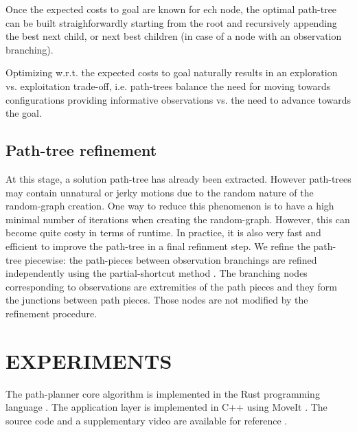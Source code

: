 \documentclass[letterpaper, 10 pt, conference]{ieeeconf}  %
\begin{document}
Once the expected costs to goal are known for ech node, the optimal path-tree can be built straighforwardly starting from the root and recursively appending the best next child, or next best children (in case of a node with an observation branching).

Optimizing w.r.t. the expected costs to goal naturally results in an exploration vs. exploitation trade-off, i.e. path-trees balance the need for moving towards configurations  providing informative observations vs. the need to advance towards the goal.

\subsection{Path-tree refinement}
At this stage, a solution path-tree has already been extracted. However path-trees may contain  unnatural or jerky motions due to the random nature of the random-graph creation. One way to reduce this phenomenon is to have a high minimal number of iterations when creating the random-graph. However, this can become quite costy in terms of runtime. In practice, it is also very fast and efficient to improve the path-tree in a final refinment step. We refine the path-tree piecewise: the path-pieces between observation branchings are refined independently using the partial-shortcut method \cite{geraerts2007creating}. The branching nodes corresponding to observations are extremities of the path pieces and they form the junctions between path pieces. Those nodes are not modified by the refinement procedure. 




\section{EXPERIMENTS}
The path-planner core algorithm is implemented in the Rust programming language \cite{matsakis2014rust}. The application layer is implemented in C++ using MoveIt \cite{coleman2014reducing}. The source code and a supplementary video are available for reference \footnotemark {}. %
\end{document}

